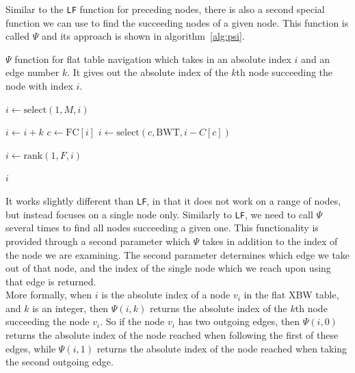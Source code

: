 \documentclass[a4paper,12pt,twoside,BCOR=10mm]{scrbook}
\begin{document}
Similar to the \texttt{LF} function for preceding nodes, there is also a second special function we can use
to find the succeeding nodes of a given node.
This function is called $ \Psi $ and its approach is shown in algorithm~\ref{alg:psi}.
\begin{algorithm}
\caption[$ \Psi $ function for flat table navigation]{$ \Psi $ function for flat table navigation which takes in an absolute index $ i $ and an edge number $ k $. It gives out the absolute index of the $ k $th node succeeding the node with index $ i $.}
\label{alg:psi}
\begin{algorithmic}[1]

\State $ i \gets \textrm{select}(1, M, i) $

\State \phantom{nl}

\State $ i \gets i + k $
\State $ c \gets \textrm{FC} [ i ] $
\State $ i \gets \textrm{select}(c, \textrm{BWT}, i - C [ c ]) $

\State \phantom{nl}

\State $ i \gets \textrm{rank}(1, F, i) $

\State \phantom{nl}

\State \Return $ i $

\end{algorithmic}
\end{algorithm}
It works slightly different than \texttt{LF},
in that it does not work on a range of nodes, but instead focuses on a single node only.
Similarly to \texttt{LF}, we need to call $ \Psi $ several times to find all nodes succeeding a given one.
This functionality is provided through a second parameter which $ \Psi $ takes
in addition to the index of the node we are examining.
The second parameter determines which edge we take out of that node,
and the index of the single node which we reach upon using that edge is returned. \\
More formally, when $ i $ is the absolute index of a node $ v_i $ in the flat XBW table,
and $ k $ is an integer, then $ \Psi (i, k) $ returns the absolute index of the $ k $th node
succeeding the node $ v_i $. So if the node $ v_i $ has two outgoing edges,
then $ \Psi (i, 0) $ returns the absolute index of the node reached when following
the first of these edges, while $ \Psi (i, 1) $ returns the absolute index of the node reached when
taking the second outgoing edge. \\
\end{document}
